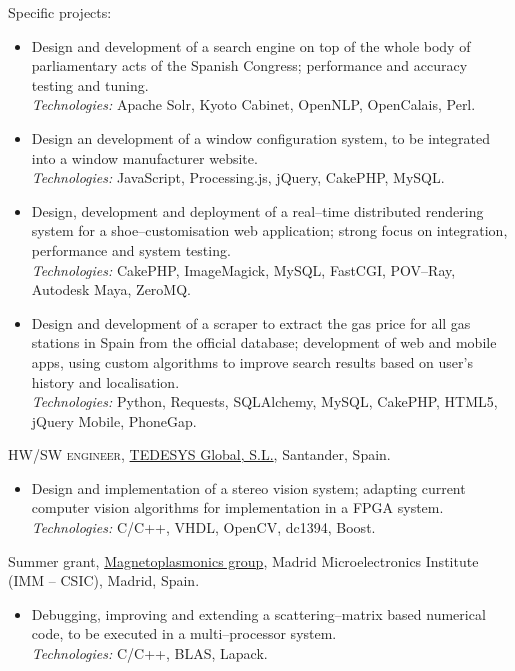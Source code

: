 \documentclass[11pt]{article}
\newcommand{\years}[1]{\marginnote{\scriptsize #1}}
\begin{document}
Specific projects:
\begin{itemize}
	\item  Design and development of a search engine on top of the whole body of parliamentary acts of the Spanish Congress; performance and accuracy testing and tuning.\\
	\textit{Technologies:} Apache Solr, Kyoto Cabinet, OpenNLP, OpenCalais, Perl.
	\item  Design an development of a window configuration system, to be integrated into a window manufacturer website.\\
	\textit{Technologies:} JavaScript, Processing.js, jQuery, CakePHP, MySQL.
	\item  Design, development and deployment of a real--time distributed rendering system for a shoe--customisation web application; strong focus on integration, performance and system testing.\\
	\textit{Technologies:} CakePHP, ImageMagick, MySQL, FastCGI, POV--Ray, Autodesk Maya, ZeroMQ.
	\item  Design and development of a scraper to extract the gas price for all gas stations in Spain from the official database; development of web and mobile apps, using custom algorithms to improve search results based on user's history and localisation.\\
	\textit{Technologies:} Python, Requests, SQLAlchemy, MySQL, CakePHP, HTML5, jQuery Mobile, PhoneGap.
\end{itemize}

\years{2011}\textsc{HW/SW engineer}, \href{http://www.tedesys.com}{TEDESYS Global, S.L.}, Santander, Spain.
\begin{itemize}
	\item  Design and implementation of a stereo vision system; adapting current computer vision algorithms for implementation in a FPGA system.\\
	\textit{Technologies:} C/C++, VHDL, OpenCV, dc1394, Boost.
\end{itemize}

\years{2008,2009}Summer grant, \href{http://www.imm.cnm.csic.es/magnetoplasmonics}{Magnetoplasmonics group}, Madrid Microelectronics Institute (IMM -- CSIC), Madrid, Spain.
\begin{itemize}
	\item  Debugging, improving and extending a scattering--matrix based numerical code, to be executed in a multi--processor system.\\
	\textit{Technologies:} C/C++, BLAS, Lapack.
\end{itemize}
\end{document}
